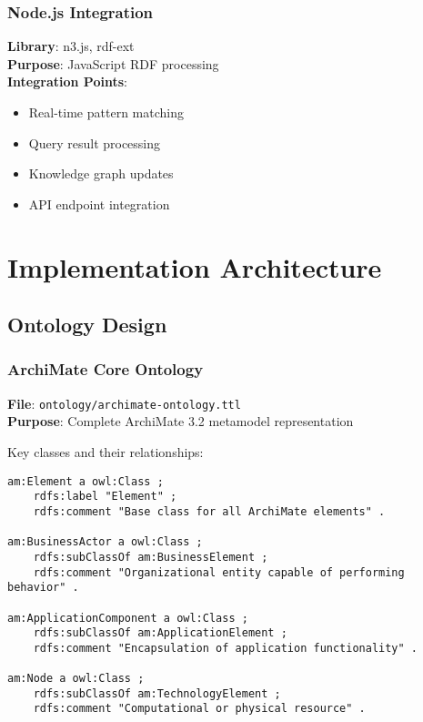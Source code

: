 \documentclass[12pt,a4paper]{article}
\begin{document}
\subsubsection{Node.js Integration}
\textbf{Library}: n3.js, rdf-ext\\
\textbf{Purpose}: JavaScript RDF processing\\
\textbf{Integration Points}:
\begin{itemize}
    \item Real-time pattern matching
    \item Query result processing
    \item Knowledge graph updates
    \item API endpoint integration
\end{itemize}

\section{Implementation Architecture}

\subsection{Ontology Design}

\subsubsection{ArchiMate Core Ontology}
\textbf{File}: \texttt{ontology/archimate-ontology.ttl}\\
\textbf{Purpose}: Complete ArchiMate 3.2 metamodel representation

Key classes and their relationships:

\begin{lstlisting}[style=turtle,caption=ArchiMate Core Classes]
am:Element a owl:Class ;
    rdfs:label "Element" ;
    rdfs:comment "Base class for all ArchiMate elements" .

am:BusinessActor a owl:Class ;
    rdfs:subClassOf am:BusinessElement ;
    rdfs:comment "Organizational entity capable of performing behavior" .

am:ApplicationComponent a owl:Class ;
    rdfs:subClassOf am:ApplicationElement ;
    rdfs:comment "Encapsulation of application functionality" .

am:Node a owl:Class ;
    rdfs:subClassOf am:TechnologyElement ;
    rdfs:comment "Computational or physical resource" .
\end{lstlisting}
\end{document}
